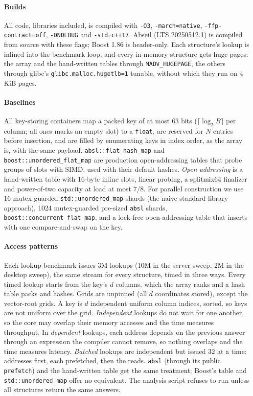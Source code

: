 \documentclass[preprint,12pt]{elsarticle}
\newcommand{\absl}{\texttt{absl::\allowbreak flat\_\allowbreak hash\_\allowbreak map}}
\newcommand{\umap}{\texttt{std::\allowbreak unordered\_\allowbreak map}}
\newcommand{\bflat}{\texttt{boost::\allowbreak unordered\_\allowbreak flat\_\allowbreak map}}
\newcommand{\bconc}{\texttt{boost::\allowbreak concurrent\_\allowbreak flat\_\allowbreak map}}
\begin{document}
\paragraph{Builds} All code, libraries included, is compiled with \texttt{-O3},
\texttt{-march=native}, \texttt{-ffp-contract=off}, \texttt{-DNDEBUG} and
\texttt{-std=c++17}. Abseil (LTS 20250512.1) is compiled from source with these
flags; Boost 1.86 is header-only. Each structure's lookup is inlined into the benchmark loop, and every in-memory structure
gets huge pages: the array and the hand-written tables through
\texttt{MADV\_HUGEPAGE}, the others through glibc's
\texttt{glibc.malloc.hugetlb=1} tunable, without which they run on 4\,KiB pages.

\paragraph{Baselines} All key-storing containers map a packed key of at most 63 bits
($\lceil\log_2B\rceil$ per column; all ones marks an empty slot) to a \texttt{float}, are reserved for
$N$ entries before insertion, and are filled by enumerating keys in index order,
as the array is, with the same payload.
\absl{}\cite{abseil} and \bflat{}\cite{boostunordered} are production
open-addressing tables that probe groups of slots with SIMD, used with their
default hashes. \emph{Open addressing} is a hand-written table with 16-byte
inline slots, linear probing, a splitmix64 finalizer and power-of-two capacity
at load at most $7/8$. For parallel construction we use 16 mutex-guarded \umap{} shards
(the naive standard-library approach), 1024 mutex-guarded pre-sized
\texttt{absl} shards, \bconc{}, and a lock-free open-addressing table that
inserts with one compare-and-swap on the key.

\paragraph{Access patterns} Each lookup benchmark issues 3M lookups (10M in the server sweep, 2M in the desktop sweep), the same stream for every structure, timed in three ways. Every timed lookup starts from the key's $d$ columns, which the array ranks and a hash table packs and hashes. Grids are unpinned (all $d$ coordinates stored), except the vector-root grids. A key is $d$ independent uniform column indices, sorted, so keys are not uniform over the grid.
\emph{Independent} lookups do not wait for one another, so the core may overlap
their memory accesses and the time measures throughput. In \emph{dependent}
lookups, each address depends on the previous answer through an expression the
compiler cannot remove, so nothing overlaps and the time measures latency.
\emph{Batched} lookups are independent but issued 32 at a time: addresses first,
each prefetched, then the reads. \texttt{absl} (through its public
\texttt{prefetch}) and the hand-written table get the same treatment; Boost's table and \umap{} offer no equivalent. The analysis script refuses to
run unless all structures return the same answers.
\end{document}

